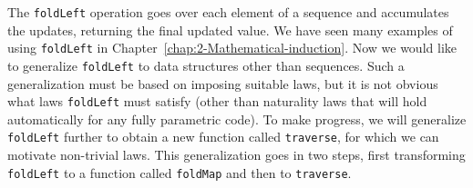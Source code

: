 The \lstinline!foldLeft! operation goes over each element of a sequence
and accumulates the updates, returning the final updated value. We
have seen many examples of using \lstinline!foldLeft! in Chapter~\ref{chap:2-Mathematical-induction}.
Now we would like to generalize \lstinline!foldLeft! to data structures
other than sequences. Such a generalization must be based on imposing
suitable laws, but it is not obvious what laws \lstinline!foldLeft!
must satisfy (other than naturality laws that will hold automatically
for any fully parametric code). To make progress, we will generalize
\lstinline!foldLeft! further to obtain a new function called \lstinline!traverse!,
for which we can motivate non-trivial laws. This generalization goes
in two steps, first transforming \lstinline!foldLeft! to a function
called \lstinline!foldMap! and then to \lstinline!traverse!. 

